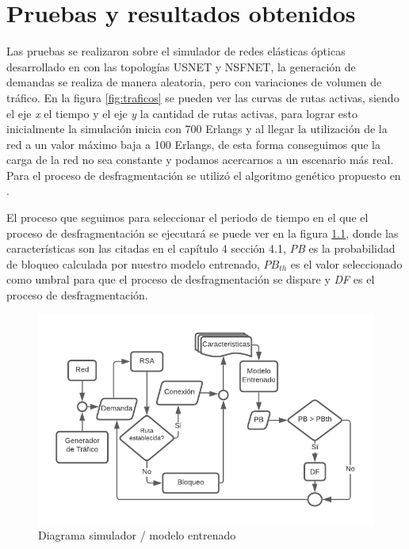 \chapter{ Pruebas y resultados obtenidos }
Las pruebas se realizaron sobre el simulador de redes elásticas ópticas desarrollado en \cite{davalos2019spectrum} con las topologías USNET y NSFNET, la generación de demandas se realiza de manera aleatoria, pero con variaciones de volumen de tráfico. En la figura \ref{fig:traficos} se pueden ver las curvas de rutas activas, siendo el eje \textit{x} el tiempo y el eje \textit{y} la cantidad de rutas activas, para lograr esto inicialmente la simulación inicia con 700 Erlangs y al llegar la utilización de la red a un valor máximo baja a 100 Erlangs, de esta forma conseguimos que la carga de la red no sea constante y podamos acercarnos a un escenario más real. Para el proceso de desfragmentación se utilizó el algoritmo genético propuesto en \cite{davalos2019spectrum}.

El proceso que seguimos para seleccionar el periodo de tiempo en el que el proceso de desfragmentación se ejecutará se puede ver en la figura \ref{fig:simuladorModelo}, donde las características son las citadas en el capítulo 4 sección 4.1, \textit{PB} es la probabilidad de bloqueo calculada por nuestro modelo entrenado, \(PB_{th}\) es el valor seleccionado como umbral para que el proceso de desfragmentación se dispare y \textit{DF} es el proceso de desfragmentación.  

\begin{figure}[h!]
    \centering
    \includegraphics[width=1\textwidth]{capitulos/img/diagramaML6.png}
    \caption{Diagrama simulador / modelo entrenado}
    \label{fig:simuladorModelo}
\end{figure}

